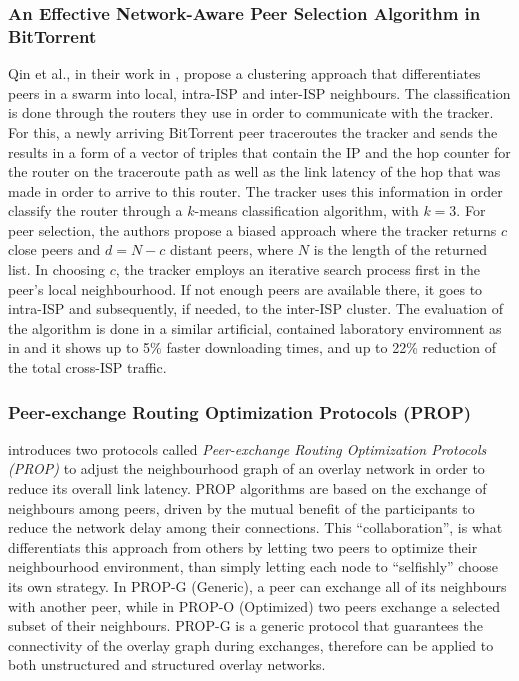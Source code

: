 \subsubsection{An Effective Network-Aware Peer Selection Algorithm in
BitTorrent}
Qin et al., in their work in \cite{qlzg_biteffpeersel_2009}, propose a
clustering approach that differentiates peers in a swarm into local, intra-ISP
and inter-ISP neighbours. The classification is done through the routers they
use in order to communicate with the tracker. For this, a newly arriving
BitTorrent peer traceroutes the tracker and sends the results in a form of a
vector of triples that contain the IP and the hop counter for the router on the
traceroute path as well as the link latency of the hop that was made in order to
arrive to this router. The tracker uses this information in order classify the
router through a $k$-means classification algorithm, with $k = 3$. For peer
selection, the authors propose a biased approach where the tracker returns $c$
close peers and $d = N - c$ distant peers, where $N$ is the length of the
returned list. In choosing $c$, the tracker employs an iterative search process
first in the peer's local neighbourhood. If not enough peers are available
there, it goes to intra-ISP and subsequently, if needed, to the inter-ISP
cluster. The evaluation of the algorithm is done in a similar artificial,
contained laboratory enviromnent as in \cite{lcy_utaps_2008} and it shows up to
5\% faster downloading times, and up to 22\% reduction of the total cross-ISP
traffic.

\subsubsection{Peer-exchange Routing Optimization Protocols (PROP)}
\cite{qiu_prop_2007} introduces two protocols called \emph{Peer-exchange Routing
Optimization Protocols (PROP)} to adjust the neighbourhood graph of an overlay
network in order to reduce its overall link latency. PROP algorithms are based
on the exchange of neighbours among peers, driven by the mutual benefit of the
participants to reduce the network delay among their connections. This
``collaboration'', is what differentiats this approach from others by letting
two peers to optimize their neighbourhood environment, than simply letting each
node to ``selfishly'' choose its own strategy. In PROP-G (Generic), a peer can
exchange all of its neighbours with another peer, while in PROP-O (Optimized)
two peers exchange a selected subset of their neighbours. PROP-G is a generic
protocol that guarantees the connectivity of the overlay graph during exchanges,
therefore can be applied to both unstructured and structured overlay networks.

